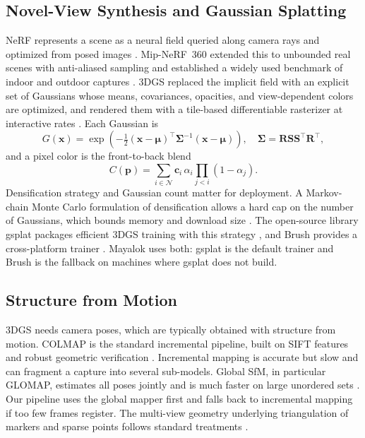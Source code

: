 \documentclass[conference]{IEEEtran}
\begin{document}
\subsection{Novel-View Synthesis and Gaussian Splatting}
NeRF represents a scene as a neural field queried along camera rays and optimized from posed images \cite{mildenhall2020nerf}. Mip-NeRF~360 extended this to unbounded real scenes with anti-aliased sampling and established a widely used benchmark of indoor and outdoor captures \cite{barron2022mipnerf360}. 3DGS replaced the implicit field with an explicit set of Gaussians whose means, covariances, opacities, and view-dependent colors are optimized, and rendered them with a tile-based differentiable rasterizer at interactive rates \cite{kerbl2023}. Each Gaussian is
\begin{equation}
G(\mathbf{x}) = \exp\!\left(-\tfrac{1}{2}(\mathbf{x}-\boldsymbol{\mu})^{\top}\boldsymbol{\Sigma}^{-1}(\mathbf{x}-\boldsymbol{\mu})\right), \quad \boldsymbol{\Sigma}=\mathbf{R}\mathbf{S}\mathbf{S}^{\top}\mathbf{R}^{\top},
\end{equation}
and a pixel color is the front-to-back blend
\begin{equation}
C(\mathbf{p}) = \sum_{i \in \mathcal{N}} \mathbf{c}_i \,\alpha_i \prod_{j<i}\left(1-\alpha_j\right).
\end{equation}
Densification strategy and Gaussian count matter for deployment. A Markov-chain Monte Carlo formulation of densification allows a hard cap on the number of Gaussians, which bounds memory and download size \cite{kheradmand2024mcmc}. The open-source library gsplat packages efficient 3DGS training with this strategy \cite{ye2024gsplat}, and Brush provides a cross-platform trainer \cite{brush}. Mayalok uses both: gsplat is the default trainer and Brush is the fallback on machines where gsplat does not build.

\subsection{Structure from Motion}
3DGS needs camera poses, which are typically obtained with structure from motion. COLMAP is the standard incremental pipeline, built on SIFT features \cite{lowe2004sift} and robust geometric verification \cite{schonberger2016sfm}. Incremental mapping is accurate but slow and can fragment a capture into several sub-models. Global SfM, in particular GLOMAP, estimates all poses jointly and is much faster on large unordered sets \cite{pan2024glomap}. Our pipeline uses the global mapper first and falls back to incremental mapping if too few frames register. The multi-view geometry underlying triangulation of markers and sparse points follows standard treatments \cite{hartley2004mvg}.
\end{document}
